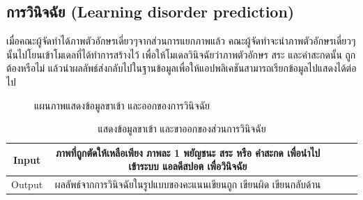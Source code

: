 \documentclass[12pt,oneside,openright,a4paper]{cpe-thai-project}
\begin{document}
  \subsection{การวินิจฉัย (Learning disorder prediction)}
  เมื่อคณะผู้จัดทำได้ภาพตัวอักษรเดี่ยวๆจากส่วนการแยกภาพแล้ว คณะผู้จัดทำจะนำภาพตัวอักษรเดี่ยวๆนั้นไปโยนเข้าโมเดลที่ได้ทำการสร้างไว้ เพื่อให้โมเดลวินิจฉัยว่าภาพตัวอักษร สระ และคำสะกดนั้น ถูกต้องหรือไม่ 
   แล้วนำผลลัพธ์ส่งกลับไปในฐานข้อมูลเพื่อให้แอปพลิเคชันสามารถเรียกข้อมูลไปแสดงได้ต่อไป 
  \begin{figure}[!ht]\centering
    \setlength{\fboxrule}{0.2mm} %
    \setlength{\fboxsep}{1cm}
    \caption{แผนภาพแสดงข้อมูลขาเข้า และออกของการวินิจฉัย}\label{fig:system}
   \end{figure}
  \begin{table}[!h]\centering
    \caption{แสดงข้อมูลขาเข้า และขาออกของส่วนการวินิจฉัย}\label{tbl:application1}
    \begin{tabular}{c|c|l|rr} \hline
    Input & ภาพที่ถูกตัดให้เหลือเพียง ภาพละ 1 พยัญชนะ สระ หรือ คำสะกด เพื่อนำไปเข้าระบบ แอลดีสปอต เพื่อวินิจฉัย  \\ \hline
    Output & ผลลัพธ์จากการวินิจฉัยในรูปแบบของคะแนนเขียนถูก เขียนผิด เขียนกลับด้าน \\ \hline
    \end{tabular}
    \end{table}
\newpage
\end{document}
